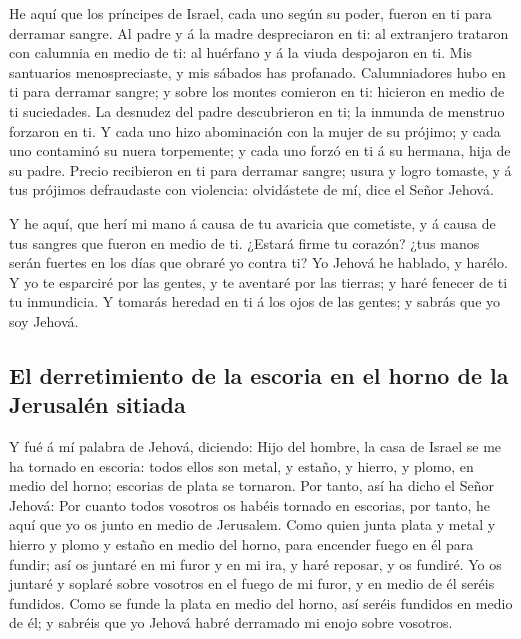  He aquí que los príncipes de Israel, cada uno según su
poder, fueron en ti para derramar sangre.  Al padre y á la
madre despreciaron en ti: al extranjero trataron con calumnia en medio
de ti: al huérfano y á la viuda despojaron en ti.  Mis
santuarios menospreciaste, y mis sábados has profanado. 
Calumniadores hubo en ti para derramar sangre; y sobre los montes
comieron en ti: hicieron en medio de ti suciedades.  La
desnudez del padre descubrieron en ti; la inmunda de menstruo forzaron
en ti.  Y cada uno hizo abominación con la mujer de su
prójimo; y cada uno contaminó su nuera torpemente; y cada uno forzó en
ti á su hermana, hija de su padre.  Precio recibieron en
ti para derramar sangre; usura y logro tomaste, y á tus prójimos
defraudaste con violencia: olvidástete de mí, dice el Señor Jehová.

 Y he aquí, que herí mi mano á causa de tu avaricia que
cometiste, y á causa de tus sangres que fueron en medio de ti.
 ¿Estará firme tu corazón? ¿tus manos serán fuertes en
los días que obraré yo contra ti? Yo Jehová he hablado, y harélo.
 Y yo te esparciré por las gentes, y te aventaré por las
tierras; y haré fenecer de ti tu inmundicia.  Y tomarás
heredad en ti á los ojos de las gentes; y sabrás que yo soy Jehová.

\hypertarget{el-derretimiento-de-la-escoria-en-el-horno-de-la-jerusaluxe9n-sitiada}{%
\subsection{El derretimiento de la escoria en el horno de la Jerusalén
sitiada}\label{el-derretimiento-de-la-escoria-en-el-horno-de-la-jerusaluxe9n-sitiada}}

 Y fué á mí palabra de Jehová, diciendo: 
Hijo del hombre, la casa de Israel se me ha tornado en escoria: todos
ellos son metal, y estaño, y hierro, y plomo, en medio del horno;
escorias de plata se tornaron.  Por tanto, así ha dicho
el Señor Jehová: Por cuanto todos vosotros os habéis tornado en
escorias, por tanto, he aquí que yo os junto en medio de Jerusalem.
 Como quien junta plata y metal y hierro y plomo y estaño
en medio del horno, para encender fuego en él para fundir; así os
juntaré en mi furor y en mi ira, y haré reposar, y os fundiré.
 Yo os juntaré y soplaré sobre vosotros en el fuego de mi
furor, y en medio de él seréis fundidos.  Como se funde
la plata en medio del horno, así seréis fundidos en medio de él; y
sabréis que yo Jehová habré derramado mi enojo sobre vosotros.

